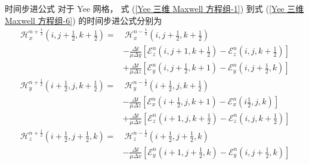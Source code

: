 \begin{theorem}{时间步进公式}
    对于 Yee 网格，
    式 (\ref{Yee 三维 Maxwell 方程组-1})
    到式 (\ref{Yee 三维 Maxwell 方程组-6})
    的时间步进公式分别为
    \begin{equation}
        \begin{aligned}
            \mathscr{H}_x^{n+\frac{1}{2}}\left(i,j+\frac{1}{2},k+\frac{1}{2}\right)=
            &\ \mathscr{H}_x^{n-\frac{1}{2}}\left(i,j+\frac{1}{2},k+\frac{1}{2}\right)\\
            &-\frac{\Delta t}{\mu \Delta y}\left[
                \mathscr{E}_z^n\left(i,j+1,k+\frac{1}{2}\right)
                -\mathscr{E}_z^n\left(i,j,k+\frac{1}{2}\right)
            \right]\\
            &+\frac{\Delta t}{\mu \Delta z}\left[
                \mathscr{E}_y^n\left(i,j+\frac{1}{2},k+1\right)
                -\mathscr{E}_y^n\left(i,j+\frac{1}{2},k\right)
            \right]
        \end{aligned}
        \label{Yee 三维时间步进公式-1}
    \end{equation}
    \begin{equation}
        \begin{aligned}
            \mathscr{H}_y^{n+\frac{1}{2}}\left(i+\frac{1}{2},j,k+\frac{1}{2}\right)=
            &\ \mathscr{H}_y^{n-\frac{1}{2}}\left(i+\frac{1}{2},j,k+\frac{1}{2}\right)\\
            &-\frac{\Delta t}{\mu \Delta z}\left[
                \mathscr{E}_x^n\left(i+\frac{1}{2},j,k+1\right)
                -\mathscr{E}_x^n\left(i\frac{1}{2},j,k\right)
            \right]\\
            &+\frac{\Delta t}{\mu \Delta x}\left[
                \mathscr{E}_z^n\left(i+1,j,k+\frac{1}{2}\right)
                -\mathscr{E}_z^n\left(i,j,k+\frac{1}{2}\right)
            \right]
        \end{aligned}
        \label{Yee 三维时间步进公式-2}
    \end{equation}
    \begin{equation}
        \begin{aligned}
            \mathscr{H}_z^{n+\frac{1}{2}}\left(i+\frac{1}{2},j+\frac{1}{2},k\right)=
            &\ \mathscr{H}_z^{n-\frac{1}{2}}\left(i+\frac{1}{2},j+\frac{1}{2},k\right)\\
            &-\frac{\Delta t}{\mu \Delta x}\left[
                \mathscr{E}_y^n\left(i+1,j+\frac{1}{2},k\right)
                -\mathscr{E}_y^n\left(i,j+\frac{1}{2},k\right)
            \right]\\

\end{aligned}
\end{equation}
\end{theorem}
